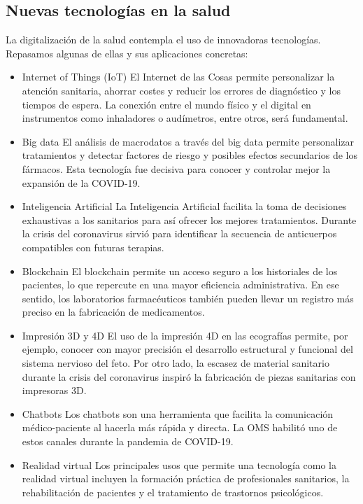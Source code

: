 \documentclass[12pt]{article}
\begin{document}
\subsection*{Nuevas tecnologías en la salud}
La digitalización de la salud contempla el uso de innovadoras tecnologías. Repasamos algunas de ellas y sus aplicaciones concretas:
\begin{itemize}
    \item Internet of Things (IoT)
El Internet de las Cosas permite personalizar la atención sanitaria, ahorrar costes y reducir los errores de diagnóstico y los tiempos de espera. La conexión entre el mundo físico y el digital en instrumentos como inhaladores o audímetros, entre otros, será fundamental.

    \item Big data
El análisis de macrodatos a través del big data permite personalizar tratamientos y detectar factores de riesgo y posibles efectos secundarios de los fármacos. Esta tecnología fue decisiva para conocer y controlar mejor la expansión de la COVID-19.

    \item Inteligencia Artificial
La Inteligencia Artificial facilita la toma de decisiones exhaustivas a los sanitarios para así ofrecer los mejores tratamientos. Durante la crisis del coronavirus sirvió para identificar la secuencia de anticuerpos compatibles con futuras terapias.

    \item Blockchain
El blockchain permite un acceso seguro a los historiales de los pacientes, lo que repercute en una mayor eficiencia administrativa. En ese sentido, los laboratorios farmacéuticos también pueden llevar un registro más preciso en la fabricación de medicamentos.

    \item Impresión 3D y 4D
El uso de la impresión 4D en las ecografías permite, por ejemplo, conocer con mayor precisión el desarrollo estructural y funcional del sistema nervioso del feto. Por otro lado, la escasez de material sanitario durante la crisis del coronavirus inspiró la fabricación de piezas sanitarias con impresoras 3D.

    \item Chatbots
Los chatbots son una herramienta que facilita la comunicación médico-paciente al hacerla más rápida y directa. La OMS habilitó uno de estos canales durante la pandemia de COVID-19.

    \item Realidad virtual
Los principales usos que permite una tecnología como la realidad virtual incluyen la formación práctica de profesionales sanitarios, la rehabilitación de pacientes y el tratamiento de trastornos psicológicos.

\end{itemize}
\end{document}
